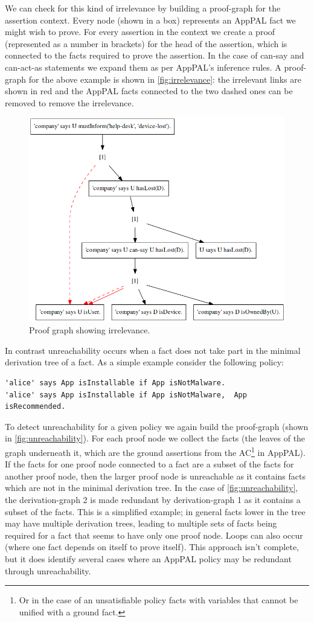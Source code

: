 \documentclass[thesis.tex]{subfiles}
\begin{document}
We can check for this kind of irrelevance by building a proof-graph for the
assertion context.  Every node (shown in a box) represents an AppPAL fact we
might wish to prove.  For every assertion in the context we create a proof
(represented as a number in brackets) for the head of the assertion, which is
connected to the facts required to prove the assertion.  In the case of can-say
and can-act-as statements we expand them as per AppPAL's inference rules.
A proof-graph for the above example is shown in \autoref{fig:irrelevance}: the
irrelevant links are shown in red and the AppPAL facts connected to the two
dashed ones can be removed to remove the irrelevance.

\begin{figure}
  \centering
  \includegraphics[width=0.5\linewidth]{./figures/irrelevance.png}
  \caption{Proof graph showing irrelevance.}
  \label{fig:irrelevance}
\end{figure}

In contrast unreachability occurs when a fact does not take part in the minimal
derivation tree of a fact.  As a simple example consider the following policy:

\begin{lstlisting}
'alice' says App isInstallable if App isNotMalware.
'alice' says App isInstallable if App isNotMalware,  App isRecommended.
\end{lstlisting}

To detect unreachability for a given policy we again build the proof-graph (shown
in \autoref{fig:unreachability}).  For each proof node we collect the facts
(the leaves of the graph underneath it, which are the ground assertions from the
AC\footnote{Or in the case of an unsatisfiable policy facts with variables that
  cannot be unified with a ground fact.} in
AppPAL).  If the facts for one proof node connected to a fact are a subset of
the facts for another proof node, then the larger proof node is unreachable as it
contains facts which are not in the minimal derivation tree.   In the case of
\autoref{fig:unreachability}, the derivation-graph 2 is made redundant by
derivation-graph 1 as it contains a subset of the facts.  This is a
simplified example; in general facts lower in the tree may have multiple
derivation trees, leading to multiple sets of facts being required for a fact
that seems to have only one proof node.  Loops can also occur (where one fact
depends on itself to prove itself).  This approach isn't complete, but it does
identify several cases where an AppPAL policy may be redundant through
unreachability.
\end{document}
